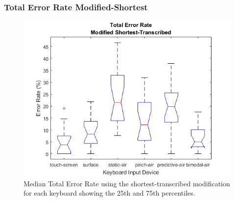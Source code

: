\subsubsection{Total Error Rate Modified-Shortest}
\begin{figure}[h]
	\centering
	\includegraphics{fig_totER_short_boxplot}
	\caption[Total Error Rate Boxplot for Modified-Shortest]{Median Total Error Rate using the shortest-transcribed modification for each keyboard showing the 25th and 75th percentiles.}
	\label{fig_totER_short_boxplot}
\end{figure}

